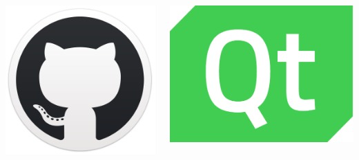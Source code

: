 \begin{frame}
\begin{columns}
        \includegraphics[width=\linewidth]{Assets/githubicon}

        \vspace{3ex}
        \includegraphics[width=\linewidth]{Assets/qt-logo.pdf}


\end{columns}
\end{frame}
